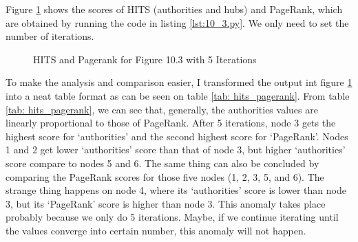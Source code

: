 \documentclass[letterpaper,11pt]{article}
\begin{document}
Figure \ref{fig:hits_pagerank} shows the scores of HITS (authorities and hubs) and PageRank, which are obtained by running the code in listing \ref{lst:10_3.py}. We only need to set the number of iterations. 

\begin{figure}[H]
	\centering
	\caption{HITS and Pagerank for Figure 10.3 with 5 Iterations}
	\label{fig:hits_pagerank}
\end{figure}

To make the analysis and comparison easier, I transformed the output int figure \ref{fig:hits_pagerank} into a neat table format as can be seen on table \ref{tab: hits_pagerank}. From table \ref{tab: hits_pagerank}, we can see that, generally, the authorities values are linearly proportional to those of PageRank. After 5 iterations, node 3 gets the highest score for `authorities' and the second highest score for `PageRank'. Nodes 1 and 2 get lower `authorities' score than that of node 3, but higher `authorities' score compare to nodes 5 and 6. The same thing can also be concluded by comparing the PageRank scores for those five nodes (1, 2, 3, 5, and 6). The strange thing happens on node 4, where its `authorities' score is lower than node 3, but its `PageRank' score is higher than node 3. This anomaly takes place probably because we only do 5 iterations. Maybe, if we continue iterating until the values converge into certain number, this anomaly will not happen. 
\end{document}
